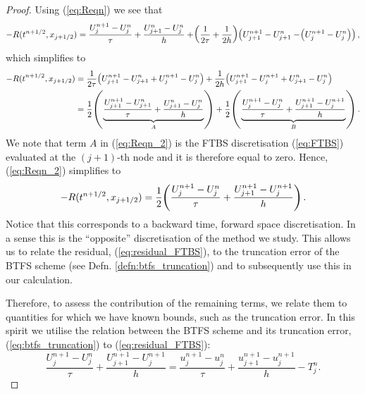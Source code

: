 \documentclass[final]{amsart}
\numberwithin{equation}{section}
\begin{document}
\begin{proof}
	Using (\ref{eq:Reqn}) we see that
	\begin{equation}\label{eq:residual_expression}
	-R(t^{n+1/2}, x_{j+1/2})
	=
	\frac{U^{n+1}_{j}-U^n_{j}}{\tau}
	+
	\frac{U^n_{j+1}-U^n_j}{h}
	+
	\!\left({\frac{1}{2\tau}+\frac{1}{2h}}\right)\!\left({U^{n+1}_{j+1} - U^{n}_{j+1} - \!\left({U^{n+1}_j - U^n_j}\right)}\right),
	\end{equation}
	which simplifies to 
	\begin{equation}\label{eq:Reqn_2}\small{
		\begin{aligned}
		-R(t^{n+1/2}, x_{j+1/2})
		&=
		\frac{1}{2\tau}\ensuremath{\!\left({U^{n+1}_{j+1} - U^{n}_{j+1} + {U^{n+1}_j - U^n_j}}\right)}
		+
		\frac{1}{2h}\ensuremath{\!\left({U^{n+1}_{j+1} - U^{n+1}_{j} + {U^{n}_{j+1} - U^n_j}}\right)}\\
		&=
		\frac{1}{2}\ensuremath{\!\left({\underbrace{\frac{U^{n+1}_{j+1} - U^{n}_{j+1}}{\tau}+
				\frac{U^{n}_{j+1} - U^n_j}{h}}_A}\right)}
		+
		\frac{1}{2}\ensuremath{\!\left({\underbrace{\frac{U^{n+1}_j - U^n_j}{\tau}+\frac{U^{n+1}_{j+1} - U^{n+1}_{j} }{h}}_B}\right)}.
		\end{aligned}}
	\end{equation}
	We note that term $A$ in (\ref{eq:Reqn_2}) is the FTBS
	discretisation (\ref{eq:FTBS}) evaluated at the $(j+1)$-th node
	and it is therefore equal to zero. Hence, (\ref{eq:Reqn_2})
	simplifies to
	\begin{equation}\label{eq:residual_FTBS}
	-R(t^{n+1/2}, x_{j+1/2})
	=
	\frac{1}{2}\!\left({\frac{U^{n+1}_j - U^n_j}{\tau}+\frac{U^{n+1}_{j+1} - U^{n+1}_{j} }{h}}\right).
	\end{equation}
	Notice that this corresponds to a backward time, forward space
	discretisation. In a sense this is the ``opposite'' discretisation of the
	method we study. This allows us to relate the residual, (\ref{eq:residual_FTBS}), to the truncation error of the BTFS scheme (see Defn. \ref{defn:btfs_truncation}) and to subsequently use this in our calculation. 
	
	Therefore, to assess the contribution of the remaining terms, we relate them to quantities for which we have known bounds, such as the truncation error.  In this spirit we utilise the relation between the BTFS scheme and its truncation error, (\ref{eq:btfs_truncation}) to (\ref{eq:residual_FTBS}):
	\begin{equation}\label{eq:scheme_truncation_error}
	\frac{U^{n+1}_{j} - U^{n}_{j}}{\tau}+
	\frac{U^{n+1}_{j+1} - U^{n+1}_{j}}{h}
	=
	\frac{u^{n+1}_{j} - u^{n}_{j}}{\tau}+
	\frac{u^{n+1}_{j+1} - u^{n+1}_{j}}{h} -T^n_j.
	\end{equation}
	

\end{proof}
\end{document}
